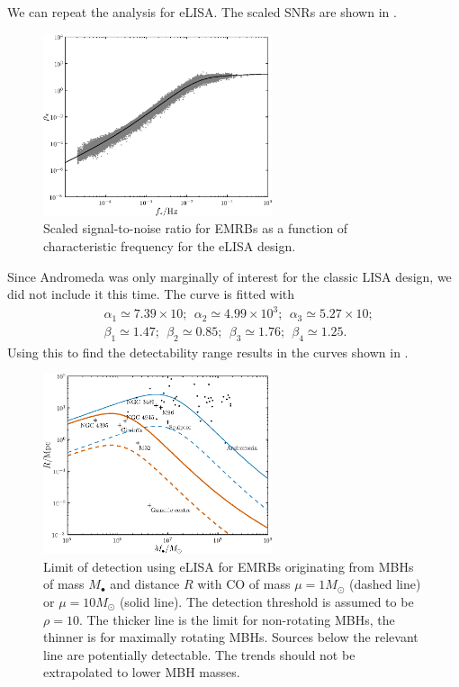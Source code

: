 We can repeat the analysis for eLISA. The scaled SNRs are shown in .
\begin{figure}[!htp]
\begin{center}
 \includegraphics[width=0.6\textwidth]{./images/Fig_SNR_scaled_fit_eLISA}
 \caption{Scaled signal-to-noise ratio for EMRBs as a function of characteristic frequency for the eLISA design.\label{fig:scaled-SNR-eLISA}}
   \end{center}
\end{figure}
Since Andromeda was only marginally of interest for the classic LISA design, we did not include it this time. The curve is fitted with
\begin{equation}
\begin{split}
&\alpha_1 \simeq 7.39 \times 10; \ \  \alpha_2 \simeq 4.99 \times 10^3; \ \  \alpha_3 \simeq 5.27 \times 10;\\
&\beta_1 \simeq 1.47; \ \  \beta_2 \simeq 0.85; \ \  \beta_3 \simeq 1.76; \ \  \beta_4 \simeq 1.25.
\end{split}
\end{equation}
Using this to find the detectability range results in the curves shown in .
\begin{figure}[!htp]
\begin{center}
 \includegraphics[width=0.6\textwidth]{./images/Fig_M_R_detect_2}
 \caption{Limit of detection using eLISA for EMRBs originating from MBHs of mass $M_\bullet$ and distance $R$ with CO of mass $\mu = 1 M_\odot$ (dashed line) or $\mu = 10 M_\odot$ (solid line). The detection threshold is assumed to be $\rho = 10$. The thicker line is the limit for non-rotating MBHs, the thinner is for maximally rotating MBHs. Sources below the relevant line are potentially detectable. The trends should not be extrapolated to lower MBH masses.\label{fig:detect-eLISA}}
   \end{center}
\end{figure}
